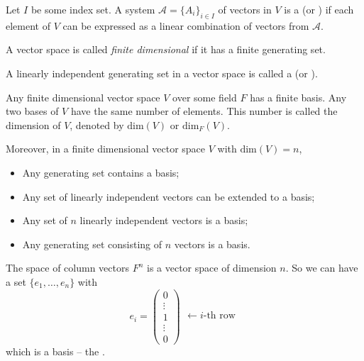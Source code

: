\begin{definition}
	Let $I$ be some index set. A system $\mathcal{A} = \{A_i\}_{i \in I}$ of vectors in $V$ is a  (or ) if each element of $V$ can be expressed as a linear combination of vectors from $\mathcal{A}$.
	
	A vector space is called \emph{finite dimensional} if it has a finite generating set.
\end{definition}

\begin{definition}
	A linearly independent generating set in a vector space is called a  (or ).
\end{definition}

\begin{theorem}
	Any finite dimensional vector space $V$ over some field $F$ has a finite basis. Any two bases of $V$ have the same number of elements. This number is called the dimension of $V$, denoted by $\text{dim}(V)$ or $\text{dim}_F(V)$.
\end{theorem}

Moreover, in a finite dimensional vector space $V$ with $\text{dim}(V) = n$,
\begin{itemize}
	\item Any generating set contains a basis;
	\item Any set of linearly independent vectors can be extended to a basis;
	\item Any set of $n$ linearly independent vectors is a basis;
	\item Any generating set consisting of $n$ vectors is a basis.
\end{itemize}

\begin{example}
	The space of column vectors $F^n$ is a vector space of dimension $n$. So we can have a set $\{e_1, \ldots, e_n\}$ with
	\[
		e_i =
		\begin{pmatrix}
			0 \\
			\vdots \\
			1 \\
			\vdots \\
			0
		\end{pmatrix}
		\begin{matrix}
			 \\
			 \\
			\leftarrow i\text{-th row} \\
			 \\
			 \\
		\end{matrix}
	\]
	which is a basis -- the .
\end{example}
